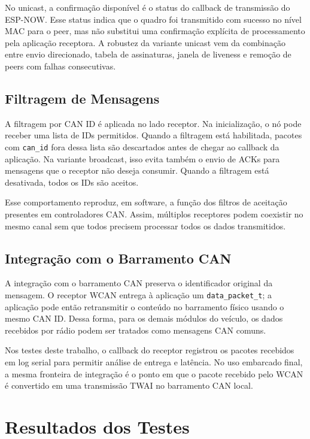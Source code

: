 \documentclass{article}
\begin{document}
    No unicast, a confirmação disponível é o status do callback de transmissão do ESP-NOW. Esse status indica que o quadro foi transmitido com sucesso no nível MAC para o peer, mas não substitui uma confirmação explícita de processamento pela aplicação receptora. A robustez da variante unicast vem da combinação entre envio direcionado, tabela de assinaturas, janela de liveness e remoção de peers com falhas consecutivas.

    \subsection{Filtragem de Mensagens}

    A filtragem por CAN ID é aplicada no lado receptor. Na inicialização, o nó pode receber uma lista de IDs permitidos. Quando a filtragem está habilitada, pacotes com \texttt{can_id} fora dessa lista são descartados antes de chegar ao callback da aplicação. Na variante broadcast, isso evita também o envio de ACKs para mensagens que o receptor não deseja consumir. Quando a filtragem está desativada, todos os IDs são aceitos.

    Esse comportamento reproduz, em software, a função dos filtros de aceitação presentes em controladores CAN. Assim, múltiplos receptores podem coexistir no mesmo canal sem que todos precisem processar todos os dados transmitidos.

    \subsection{Integração com o Barramento CAN}

    A integração com o barramento CAN preserva o identificador original da mensagem. O receptor WCAN entrega à aplicação um \texttt{data_packet_t}; a aplicação pode então retransmitir o conteúdo no barramento físico usando o mesmo CAN ID. Dessa forma, para os demais módulos do veículo, os dados recebidos por rádio podem ser tratados como mensagens CAN comuns.

    Nos testes deste trabalho, o callback do receptor registrou os pacotes recebidos em log serial para permitir análise de entrega e latência. No uso embarcado final, a mesma fronteira de integração é o ponto em que o pacote recebido pelo WCAN é convertido em uma transmissão TWAI no barramento CAN local.


    \section{Resultados dos Testes}
\end{document}
